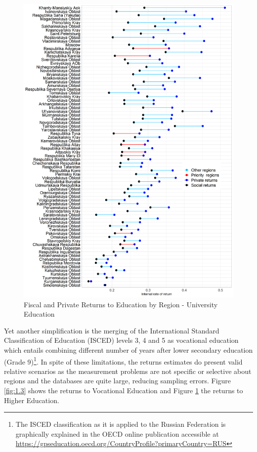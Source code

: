 \documentclass[alpha-refs]{wiley-article-05g}
\begin{document}
\begin{center}
	\begin{figure}[htbp!]
\begin{minipage}[b]{1\linewidth}
			\centering
			\includegraphics[scale=0.52]{returns_by_region_plot1.png}
		\end{minipage}
			\caption{Fiscal and Private Returns to Education by Region - 
			University Education}\label{fig:1.4}
	\end{figure}
\end{center}

\vspace{-2em}

Yet another simplification is the merging of the International Standard 
Classification of Education (ISCED) levels 3, 4 and 5 as vocational 
education which entails combining different number of years after lower 
secondary education (Grade 9)\footnote{The ISCED classification as it is 
applied to the Russian Federation is graphically explained in the OECD 
online publication accessible at \\ 
\url{https://gpseducation.oecd.org/CountryProfile?primaryCountry=RUS}}. In 
spite of these limitations, the returns estimates do present valid relative 
scenarios as the measurement problems are not specific or selective about 
regions and the databases are quite large, reducing sampling errors. Figure 
\ref{fig:1.3}  shows the returns to Vocational Education and Figure 
\ref{fig:1.4} the returns to Higher Education. 
\end{document}
